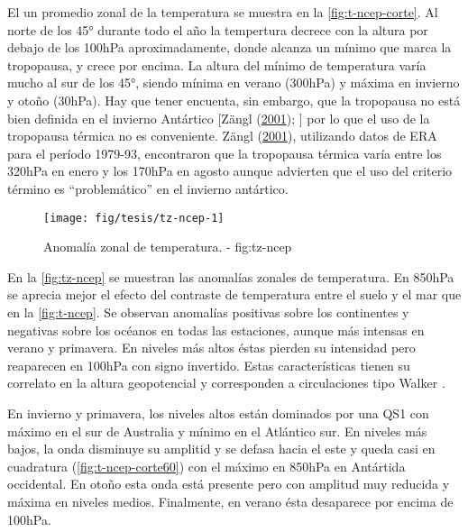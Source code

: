 \documentclass[spanish,a4paper]{book}
\begin{document}
El un promedio zonal de la temperatura se muestra en la
\autoref{fig:t-ncep-corte}. Al norte de los 45° durante todo el año la
tempertura decrece con la altura por debajo de los 100hPa
aproximadamente, donde alcanza un mínimo que marca la tropopausa, y
crece por encima. La altura del mínimo de temperatura varía mucho al sur
de los 45°, siendo mínima en verano (300hPa) y máxima en invierno y
otoño (30hPa). Hay que tener encuenta, sin embargo, que la tropopausa no
está bien definida en el invierno Antártico {[}Zängl
(\protect\hyperlink{ref-Zangl2001}{2001});
{]} por
lo que el uso de la tropopausa térmica no es conveniente. Zängl
(\protect\hyperlink{ref-Zangl2001}{2001}), utilizando datos de ERA para
el período 1979-93, encontraron que la tropopausa térmica varía entre
los 320hPa en enero y los 170hPa en agosto aunque advierten que el uso
del criterio término es ``problemático'' en el invierno antártico.

\begin{landscape}\begin{figure}

{\centering \texttt{[image: fig/tesis/tz-ncep-1]} 

}

\caption{Anomalía zonal de temperatura. - fig:tz-ncep}\label{fig:tz-ncep}
\end{figure}
\end{landscape}

En la \autoref{fig:tz-ncep} se muestran las anomalías zonales de
temperatura. En 850hPa se aprecia mejor el efecto del contraste de
temperatura entre el suelo y el mar que en la \autoref{fig:t-ncep}. Se
observan anomalías positivas sobre los continentes y negativas sobre los
océanos en todas las estaciones, aunque más intensas en verano y
primavera. En niveles más altos éstas pierden su intensidad pero
reaparecen en 100hPa con signo invertido. Estas características tienen
su correlato en la altura geopotencial y corresponden a circulaciones
tipo Walker .

En invierno y primavera, los niveles altos están dominados por una QS1
con máximo en el sur de Australia y mínimo en el Atlántico sur. En
niveles más bajos, la onda disminuye su amplitid y se defasa hacia el
este y queda casi en cuadratura (\autoref{fig:t-ncep-corte60}) con el
máximo en 850hPa en Antártida occidental. En otoño esta onda está
presente pero con amplitud muy reducida y máxima en niveles medios.
Finalmente, en verano ésta desaparece por encima de 100hPa.
\end{document}
